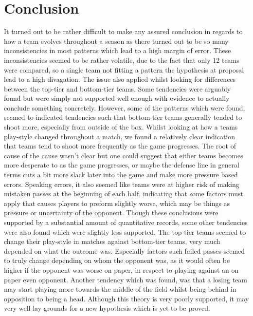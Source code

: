 \documentclass[11pt]{article}
\begin{document}
 

\section*{Conclusion}

It turned out to be rather difficult to make any assured conclusion in regards to how a team evolves throughout a season as there turned out to be so many inconsistencies in most patterns which lead to a high margin of error. These inconsistencies seemed to be rather volatile, due to the fact that only 12 teams were compared, so a single team not fitting a pattern the hypothesis at proposal lead to a high divagation. The issue also applied whilst looking for differences between the top-tier and bottom-tier teams. Some tendencies were arguably found but were simply not supported well enough with evidence to actually conclude something concretely. However, some of the patterns which were found, seemed to indicated tendencies such that bottom-tier teams generally tended to shoot more, especially from outside of the box. Whilst looking at how a teams play-style changed throughout a match, we found a relatively clear indication that teams tend to shoot more frequently as the game progresses. The root of cause of the cause wasn't clear but one could suggest that either teams becomes more desperate to as the game progresses, or maybe the defense line in general terms cuts a bit more slack later into the game and make more pressure based errors. Speaking errors, it also seemed like teams were at higher risk of making mistaken passes at the beginning of each half, indicating that some factors must apply that causes players to preform slightly worse, which may be things as pressure or uncertainty of the opponent. Though these conclusions were supported by a substantial amount of quantitative records, some other tendencies were also found which were slightly less supported. The top-tier teams seemed to change their play-style in matches against bottom-tier teams, very much depended on what the outcome was. Especially factors such failed passes seemed to truly change depending on whom the opponent was, as it would often be higher if the opponent was worse on paper, in respect to playing against an on paper even opponent. Another tendency which was found, was that a losing team may start playing more towards the middle of the field whilst being behind in opposition to being a head. Although this theory is very poorly supported, it may very well lay grounds for a new hypothesis which is yet to be proved.
\end{document}
